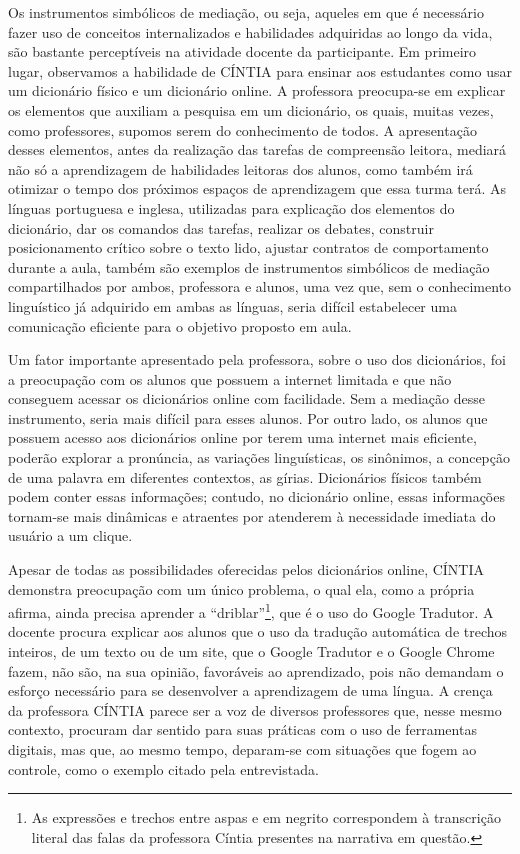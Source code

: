 \documentclass{textolivre}
\begin{document}
Os instrumentos simbólicos de mediação, ou seja, aqueles em que é necessário fazer uso de conceitos internalizados e habilidades adquiridas ao longo da vida, são bastante perceptíveis na atividade docente da participante. Em primeiro lugar, observamos a habilidade de CÍNTIA para ensinar aos estudantes como usar um dicionário físico e um dicionário online. A professora preocupa-se em explicar os elementos que auxiliam a pesquisa em um dicionário, os quais, muitas vezes, como professores, supomos serem do conhecimento de todos. A apresentação desses elementos, antes da realização das tarefas de compreensão leitora, mediará não só a aprendizagem de habilidades leitoras dos alunos, como também irá otimizar o tempo dos próximos espaços de aprendizagem que essa turma terá. As línguas portuguesa e inglesa, utilizadas para explicação dos elementos do dicionário, dar os comandos das tarefas, realizar os debates, construir posicionamento crítico sobre o texto lido, ajustar contratos de comportamento durante a aula, também são exemplos de instrumentos simbólicos de mediação compartilhados por ambos, professora e alunos, uma vez que, sem o conhecimento linguístico já adquirido em ambas as línguas, seria difícil estabelecer uma comunicação eficiente para o objetivo proposto em aula.

Um fator importante apresentado pela professora, sobre o uso dos dicionários, foi a preocupação com os alunos que possuem a internet limitada e que não conseguem acessar os dicionários online com facilidade. Sem a mediação desse instrumento, seria mais difícil para esses alunos. Por outro lado, os alunos que possuem acesso aos dicionários online por terem uma internet mais eficiente, poderão explorar a pronúncia, as variações linguísticas, os sinônimos, a concepção de uma palavra em diferentes contextos, as gírias. Dicionários físicos também podem conter essas informações; contudo, no dicionário online, essas informações tornam-se mais dinâmicas e atraentes por atenderem à necessidade imediata do usuário a um clique.

Apesar de todas as possibilidades oferecidas pelos dicionários online, CÍNTIA demonstra preocupação com um único problema, o qual ela, como a própria afirma, ainda precisa aprender a “driblar”\footnote{As expressões e trechos entre aspas e em negrito correspondem à transcrição literal das falas da professora Cíntia presentes na narrativa em questão.}, que é o uso do Google Tradutor. A docente procura explicar aos alunos que o uso da tradução automática de trechos inteiros, de um texto ou de um site, que o Google Tradutor e o Google Chrome fazem, não são, na sua opinião, favoráveis ao aprendizado, pois não demandam o esforço necessário para se desenvolver a aprendizagem de uma língua. A crença da professora CÍNTIA parece ser a voz de diversos professores que, nesse mesmo contexto, procuram dar sentido para suas práticas com o uso de ferramentas digitais, mas que, ao mesmo tempo, deparam-se com situações que fogem ao controle, como o exemplo citado pela entrevistada.
\end{document}
